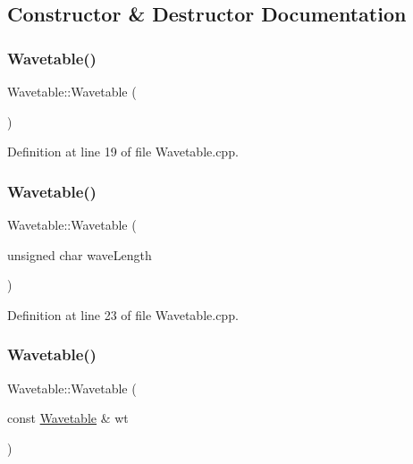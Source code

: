 \subsection{Constructor \& Destructor Documentation}
\mbox{\label{class_wavetable_a8dd3b6ebfc62270237f53cab076ded22}} 
\subsubsection{\texorpdfstring{Wavetable()}{Wavetable()}\hspace{0.1cm}{\footnotesize\ttfamily [1/3]}}
{\footnotesize\ttfamily Wavetable\+::\+Wavetable (\begin{DoxyParamCaption}{ }\end{DoxyParamCaption})}



Definition at line 19 of file Wavetable.\+cpp.

\mbox{\label{class_wavetable_a4b95309638a0ba90cf170e8e0b8fa453}} 
\subsubsection{\texorpdfstring{Wavetable()}{Wavetable()}\hspace{0.1cm}{\footnotesize\ttfamily [2/3]}}
{\footnotesize\ttfamily Wavetable\+::\+Wavetable (\begin{DoxyParamCaption}\item[{unsigned char}]{wave\+Length }\end{DoxyParamCaption})}



Definition at line 23 of file Wavetable.\+cpp.

\mbox{\label{class_wavetable_ad0d61af03ebf9df4989971ed42245d8f}} 
\subsubsection{\texorpdfstring{Wavetable()}{Wavetable()}\hspace{0.1cm}{\footnotesize\ttfamily [3/3]}}
{\footnotesize\ttfamily Wavetable\+::\+Wavetable (\begin{DoxyParamCaption}\item[{const \hyperlink{class_wavetable}{Wavetable} \&}]{wt }\end{DoxyParamCaption})}



